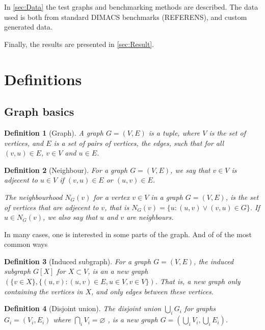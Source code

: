 \documentclass{amsart}
\newtheorem{definition}{Definition}[section]
\begin{document}
In \autoref{sec:Data} the test graphs and benchmarking methods are described. The data
used is both from standard DIMACS benchmarks (REFERENS), and custom generated data.

Finally, the results are presented in \autoref{sec:Result}.

\section{Definitions}
\label{sec:Definitions}

\subsection{Graph basics}
\label{sec:GraphBasics}

\begin{definition}[Graph]
    A graph $G = (V,E)$ is a tuple, where $V$ is the set of vertices, and $E$ is
    a set of pairs of vertices, the edges, such that for all $(v,u) \in E$,
    $v \in V$ and $u \in E$.
\end{definition}
\begin{definition}[Neighbour]
    For a graph $G = (V,E)$, we say that $v \in V$ is adjecent to 
    $u \in V$ if $(v,u) \in E$ or $(u,v) \in E$. 

    The neighbourhood $N_G(v)$ for a vertex $v \in V$ in a graph $G = (V,E)$,
    is the set of vertices that are adjecent to $v$, that is 
    $N_G(v) = \{u : (u,v) \vee (v,u) \in G\}$. If $u \in N_G(v)$, we also say
    that $u$ and $v$ are neighbours.
\end{definition}


In many cases, one is interested in some parts of the graph. And of of the most
common ways 

\begin{definition}[Induced subgraph]
    
    For a graph $G = (V,E)$, the induced subgraph $G[X]$ for $X \subset V$, is
    an a new graph $(\{v \in X\},\{(u,v) : (u,v) \in E, u \in V,v \in V\})$. That
    is, a new graph only containing the vertices in $X$, and only edges between
    these vertices.

\end{definition}

\begin{definition}[Disjoint union]
    The disjoint union $\bigcup_i G_i$ for graphs $G_i = (V_i,E_i)$ where 
    $\bigcap_i V_i = \varnothing $ , is a new graph
    $G = \left( \bigcup_i V_i,\bigcup_i E_i \right)$.
\end{definition}
\end{document}
